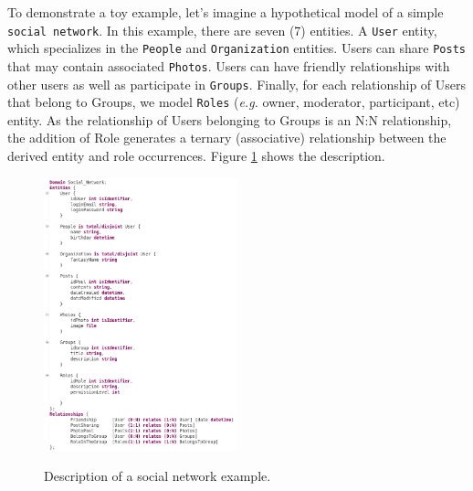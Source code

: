 
To demonstrate a toy example, let's imagine a hypothetical model of a simple \texttt{social network}.
In this example, there are seven (7) entities.
A \texttt{User} entity, which specializes in the \texttt{People} and \texttt{Organization} entities.
Users can share \texttt{Posts} that may contain associated \texttt{Photos}.
Users can have friendly relationships with other users as well as participate in \texttt{Groups}.
Finally, for each relationship of Users that belong to Groups, we model \texttt{Roles} (\textit{e.g.} owner, moderator, participant, etc) entity.
As the relationship of Users belonging to Groups is an N:N relationship, the addition of Role generates a ternary (associative) relationship between the derived entity and role occurrences.
Figure \ref{fig:toyExampleDSlDescription} shows the description.

\begin{figure}[!htb]
    \centering
    \caption{Description of a social network example.}
    \includegraphics[width=0.5\textwidth]{img/toyExampleDSlDescription.png}
    \label{fig:toyExampleDSlDescription}
\end{figure}

